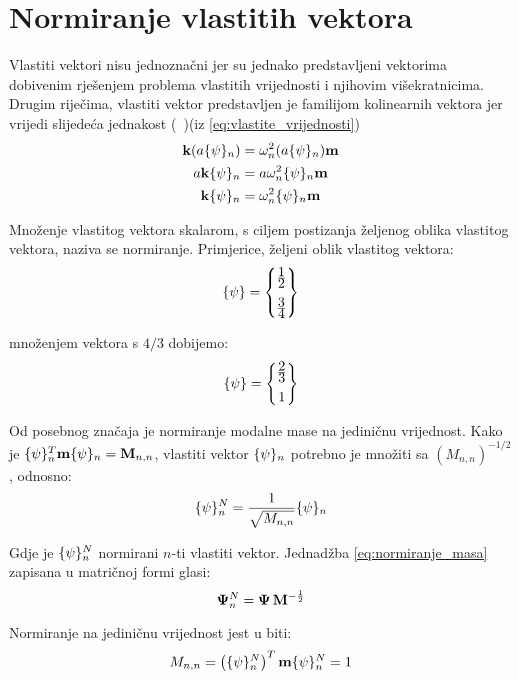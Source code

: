 \section{Normiranje vlastitih vektora}\label{sec:normiranje}
Vlastiti vektori nisu jednoznačni jer su jednako predstavljeni vektorima dobivenim
rješenjem problema vlastitih vrijednosti i njihovim višekratnicima. Drugim riječima,
vlastiti vektor predstavljen je familijom kolinearnih vektora jer vrijedi slijedeća
jednakost (~\cite{hefangfu2001})(iz \eqref{eq:vlastite_vrijednosti})
\[
    \begin{aligned}
        \kk(a\vtor{\psi}{}_n)&=\omega_n^2(a\vtor{\psi}{}_n)\mm\\
        a\kk\vtor{\psi}{}_n&=a\omega_n^2\vtor{\psi}{}_n\mm\\
        \kk\vtor{\psi}{}_n&=\omega_n^2\vtor{\psi}{}_n\mm
    \end{aligned}
\]

Množenje vlastitog vektora skalarom, s ciljem postizanja željenog oblika vlastitog
vektora, naziva se normiranje. Primjerice, željeni oblik vlastitog vektora: 
\[
    \vtor{\psi}{}=
        \begin{Bmatrix}
            \ffrac{1}{2}\\[8pt]
            \ffrac{3}{4}
        \end{Bmatrix}
\]

množenjem vektora s $4/3$ dobijemo:
\[
    \vtor{\psi}{}=
        \begin{Bmatrix}
            \ffrac{2}{3}\\[6pt]
            1
        \end{Bmatrix}
\]

Od posebnog značaja je normiranje modalne mase na jediničnu vrijednost. Kako je
$\vtor{\psi}{}_n^T\mm\vtor{\psi}{}_n=\mathbf{M}_{n,n}$, vlastiti vektor $\vtor{\psi}{}_n$
potrebno je množiti sa $(M_{n,n})^{-1/2}$, odnosno:
\begin{equation}\label{eq:normiranje_masa}
    \vtor{\psi}{}_n^N=\frac{1}{\sqrt{M_{n,n}}}\vtor{\psi}{}_n
\end{equation}

Gdje je $\vtor{\psi}{}_n^N$ normirani $n$-ti vlastiti vektor. Jednadžba
\eqref{eq:normiranje_masa} zapisana u matričnoj formi glasi:
\begin{equation}\label{eq:normiranje_masa_matricno}
    \mathbf{\Psi}_n^N=\mathbf{\Psi}\,\mathbf{M}^{-\frac{1}{2}}
\end{equation}

Normiranje na jediničnu vrijednost jest u biti:
\begin{equation}\label{eq:relacija_normirani}
        M_{n,n}=\left(\vtor{\psi}{}_n^N\right)^T\mm\vtor{\psi}{}_n^N=1
\end{equation}

